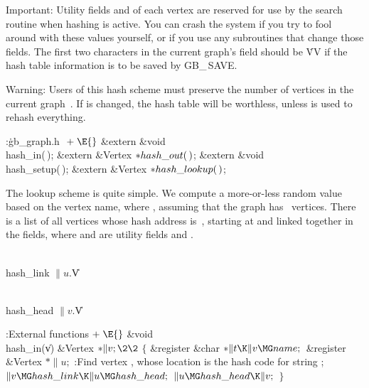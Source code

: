 Important: Utility fields  and  of each vertex are reserved for
use by
the search routine when hashing is active. You can crash the system
if you try to fool around with these values yourself, or if you use any
subroutines that change those fields. The first two characters in the
current graph's  field should be \.{VV} if the hash table
information is to be saved by {\sc GB\_\,SAVE}.

Warning: Users of this hash scheme must preserve the number of
vertices  in the current graph~. If  is
changed,
the hash table will be worthless, unless  is used to
rehash everything.

\Y\B\4:\.{gb\_graph.h }\X${}\mathrel+\E{}$\6
\&{extern} \&{void} \\{hash\_in}(\,);\6
\&{extern} \&{Vertex} ${}{*}\\{hash\_out}(\,){}$;\6
\&{extern} \&{void} \\{hash\_setup}(\,);\6
\&{extern} \&{Vertex} ${}{*}\\{hash\_lookup}(\,){}$;\par
\fi

The lookup scheme is quite simple. We compute a more-or-less random
value  based on the vertex name, where , assuming
that
the graph has ~vertices. There is a list of all vertices whose hash
address is~, starting at  and linked
together in the  fields, where  and  are
utility fields  and .

\Y\B\4\D\\{hash\_link}\5
$\|u.{}$\|V\par
\B\4\D\\{hash\_head}\5
$\|v.{}$\|V\par
\fi

\B{}:External functions\X${}\mathrel+\E{}$\6
\1\1\&{void} \\{hash\_in}(\|v)\6
\&{Vertex} ${}{*}\|v;\2\2{}$\6
${}\{{}$\5
\1\&{register} \&{char} ${}{*}\|t\K\|v\MG\\{name};{}$\6
\&{register} \&{Vertex} ${}{*}\|u;{}$\7
:Find vertex , whose location is the hash code for string %
\X;\6
${}\|v\MG\\{hash\_link}\K\|u\MG\\{hash\_head};{}$\6
${}\|u\MG\\{hash\_head}\K\|v;{}$\6
\4${}\}{}$\2\par
\fi

